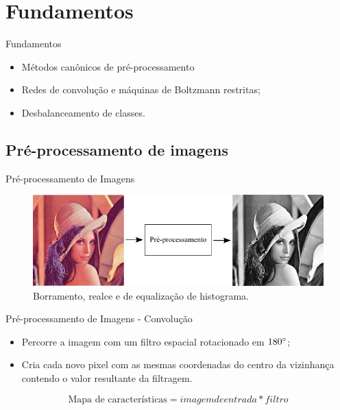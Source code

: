 \documentclass{beamer}
\begin{document}
\section{Fundamentos}
\begin{frame}{Fundamentos}
\begin{itemize}
    \item Métodos canônicos de pré-processamento
    \item Redes de convolução e máquinas de Boltzmann restritas;
    \item Desbalanceamento de classes.
\end{itemize}
\end{frame}
\subsection{Pré-processamento de imagens}
\begin{frame}{Pré-processamento de Imagens}
\begin{figure}[htbp]
 \begin{center}
   \includegraphics[width=1\linewidth]{figuras/preprocessamento.png}
 \caption{Borramento, realce e de equalização de histograma.}
 \end{center}
\end{figure}
\end{frame}
\begin{frame}{Pré-processamento de Imagens - Convolução}
\begin{itemize}
    \item Percorre a imagem com um filtro espacial rotacionado em $180\degree$; \\
    \item Cria cada novo pixel com as mesmas coordenadas do centro da vizinhança contendo o valor resultante da filtragem.
\end{itemize}
\begin{equation}
\text{Mapa de características} = imagem de entrada * filtro
\end{equation}
\end{frame}
\end{document}

